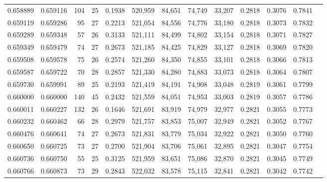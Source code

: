 \begin{tabular}{rrrrrrrrrrrrr}
0.658889 & 0.659116 &    104 &    25 &                                     0.1938 & 520,959 &  84,651 &  74,749 &  33,207 & 0.2818 & 0.3076 & 0.7841 \\
0.659119 & 0.659286 &     95 &    27 &                                     0.2213 & 521,054 &  84,556 &  74,776 &  33,180 & 0.2818 & 0.3073 & 0.7832 \\
0.659289 & 0.659348 &     57 &    26 &                                     0.3133 & 521,111 &  84,499 &  74,802 &  33,154 & 0.2818 & 0.3071 & 0.7827 \\
0.659349 & 0.659479 &     74 &    27 &                                     0.2673 & 521,185 &  84,425 &  74,829 &  33,127 & 0.2818 & 0.3069 & 0.7820 \\
0.659508 & 0.659578 &     75 &    26 &                                     0.2574 & 521,260 &  84,350 &  74,855 &  33,101 & 0.2818 & 0.3066 & 0.7813 \\
0.659587 & 0.659722 &     70 &    28 &                                     0.2857 & 521,330 &  84,280 &  74,883 &  33,073 & 0.2818 & 0.3064 & 0.7807 \\
0.659730 & 0.659991 &     89 &    25 &                                     0.2193 & 521,419 &  84,191 &  74,908 &  33,048 & 0.2819 & 0.3061 & 0.7799 \\
0.660000 & 0.660000 &    140 &    45 &                                     0.2432 & 521,559 &  84,051 &  74,953 &  33,003 & 0.2819 & 0.3057 & 0.7786 \\
0.660011 & 0.660227 &    132 &    26 &                                     0.1646 & 521,691 &  83,919 &  74,979 &  32,977 & 0.2821 & 0.3055 & 0.7773 \\
0.660232 & 0.660462 &     66 &    28 &                                     0.2979 & 521,757 &  83,853 &  75,007 &  32,949 & 0.2821 & 0.3052 & 0.7767 \\
0.660476 & 0.660641 &     74 &    27 &                                     0.2673 & 521,831 &  83,779 &  75,034 &  32,922 & 0.2821 & 0.3050 & 0.7760 \\
0.660650 & 0.660725 &     73 &    27 &                                     0.2700 & 521,904 &  83,706 &  75,061 &  32,895 & 0.2821 & 0.3047 & 0.7754 \\
0.660736 & 0.660750 &     55 &    25 &                                     0.3125 & 521,959 &  83,651 &  75,086 &  32,870 & 0.2821 & 0.3045 & 0.7749 \\
0.660766 & 0.660873 &     73 &    29 &                                     0.2843 & 522,032 &  83,578 &  75,115 &  32,841 & 0.2821 & 0.3042 & 0.7742 \\

\end{tabular}

